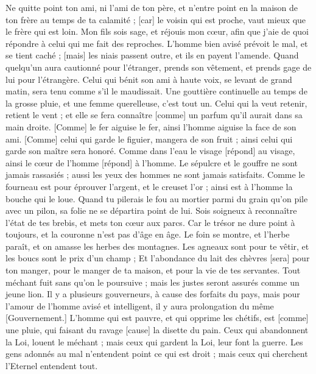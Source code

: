 \begin{multicols}{2}
Ne quitte point ton ami, ni l'ami de ton père, et n'entre point en la maison de ton frère au temps de ta calamité ; [car] le voisin qui est proche, vaut mieux que le frère qui est loin.
Mon fils sois sage, et réjouis mon cœur, afin que j'aie de quoi répondre à celui qui me fait des reproches.
L'homme bien avisé prévoit le mal, et se tient caché ; [mais] les niais passent outre, et ils en payent l'amende.
Quand quelqu'un aura cautionné pour l'étranger, prends son vêtement, et prends gage de lui pour l'étrangère.
Celui qui bénit son ami à haute voix, se levant de grand matin, sera tenu comme s'il le maudissait.
Une gouttière continuelle au temps de la grosse pluie, et une femme querelleuse, c'est tout un.
Celui qui la veut retenir, retient le vent ; et elle se fera connaître [comme] un parfum qu'il aurait dans sa main droite.
[Comme] le fer aiguise le fer, ainsi l'homme aiguise la face de son ami.
[Comme] celui qui garde le figuier, mangera de son fruit ; ainsi celui qui garde son maître sera honoré.
Comme dans l'eau le visage [répond] au visage, ainsi le cœur de l'homme [répond] à l'homme.
Le sépulcre et le gouffre ne sont jamais rassasiés ; aussi les yeux des hommes ne sont jamais satisfaits.
Comme le fourneau est pour éprouver l'argent, et le creuset l'or ; ainsi est à l'homme la bouche qui le loue.
Quand tu pilerais le fou au mortier parmi du grain qu'on pile avec un pilon, sa folie ne se départira point de lui.
Sois soigneux à reconnaître l'état de tes brebis, et mets ton cœur aux parcs.
Car le trésor ne dure point à toujours, et la couronne n'est pas d'âge en âge.
Le foin se montre, et l'herbe paraît, et on amasse les herbes des montagnes.
Les agneaux sont pour te vêtir, et les boucs sont le prix d'un champ ;
Et l'abondance du lait des chèvres [sera] pour ton manger, pour le manger de ta maison, et pour la vie de tes servantes.
\VerseOne{}Tout méchant fuit sans qu'on le poursuive ; mais les justes seront assurés comme un jeune lion.
Il y a plusieurs gouverneurs, à cause des forfaits du pays, mais pour l'amour de l'homme avisé et intelligent, il y aura prolongation du même [Gouvernement.]
L'homme qui est pauvre, et qui opprime les chétifs, est [comme] une pluie, qui faisant du ravage [cause] la disette du pain.
Ceux qui abandonnent la Loi, louent le méchant ; mais ceux qui gardent la Loi, leur font la guerre.
Les gens adonnés au mal n'entendent point ce qui est droit ; mais ceux qui cherchent l'Eternel entendent tout.

\end{multicols}
